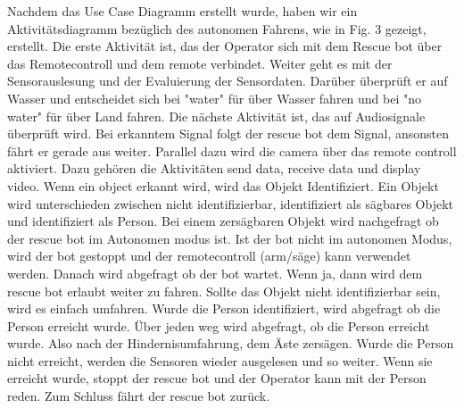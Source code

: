 \documentclass[conference]{IEEEtran}
\begin{document}
Nachdem das Use Case Diagramm erstellt wurde, haben wir ein Aktivitätsdiagramm bezüglich des autonomen Fahrens, wie in Fig. 3 gezeigt, erstellt. Die erste Aktivität ist, das der Operator sich mit dem Rescue bot über das Remotecontroll und dem remote verbindet. Weiter geht es mit der Sensorauslesung und der Evaluierung der Sensordaten. Darüber überprüft er auf Wasser und entscheidet sich bei "water" für über Wasser fahren und bei "no water" für über Land fahren. Die nächste Aktivität ist, das auf Audiosignale überprüft wird. Bei erkanntem Signal folgt der rescue bot dem Signal, ansonsten fährt er gerade aus weiter. Parallel dazu wird die camera über das remote controll aktiviert. Dazu gehören die Aktivitäten send data, receive data und display video. Wenn ein object erkannt wird, wird das Objekt Identifiziert. Ein Objekt wird unterschieden zwischen nicht identifizierbar, identifiziert als sägbares Objekt und identifiziert als Person. Bei einem zersägbaren Objekt wird nachgefragt ob der rescue bot im Autonomen modus ist. Ist der bot nicht im autonomen Modus, wird der bot gestoppt und der remotecontroll (arm/säge) kann verwendet werden. Danach wird abgefragt ob der bot wartet. Wenn ja, dann wird dem rescue bot erlaubt weiter zu fahren. Sollte das Objekt nicht identifizierbar sein, wird es einfach umfahren. Wurde die Person identifiziert, wird abgefragt ob die Person erreicht wurde. Über jeden weg wird abgefragt, ob die Person erreicht wurde. Also nach der Hindernisumfahrung, dem Äste zersägen. Wurde die Person nicht erreicht, werden die Sensoren wieder ausgelesen und so weiter. Wenn sie erreicht wurde, stoppt der rescue bot und der Operator kann mit der Person reden. Zum Schluss fährt der rescue bot zurück.
\end{document}
